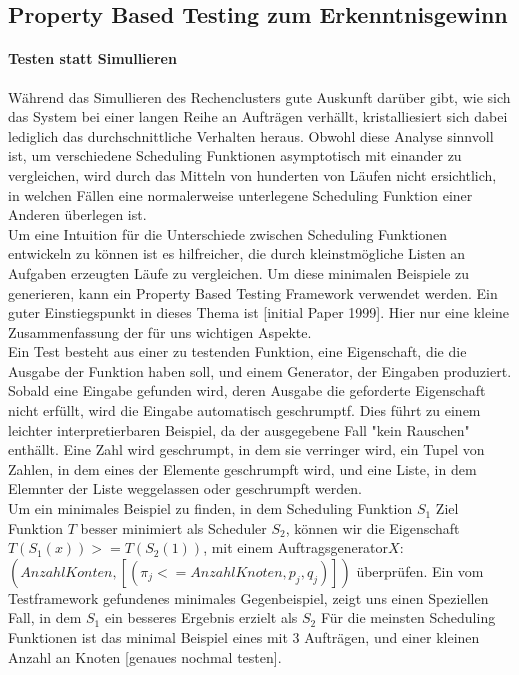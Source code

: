 \FloatBarrier

\subsection{Property Based Testing zum Erkenntnisgewinn}
\label{proptest}
\paragraph{Testen statt Simullieren}
Während das Simullieren des Rechenclusters gute Auskunft darüber gibt, wie sich das System bei einer langen Reihe an Aufträgen verhällt, kristalliesiert sich dabei lediglich das durchschnittliche Verhalten heraus. Obwohl diese Analyse sinnvoll ist, um verschiedene Scheduling Funktionen asymptotisch mit einander zu vergleichen, wird durch das Mitteln von hunderten von Läufen nicht ersichtlich, in welchen Fällen eine normalerweise unterlegene Scheduling Funktion einer Anderen überlegen ist.\\
Um eine Intuition für die Unterschiede zwischen Scheduling Funktionen entwickeln zu können ist es hilfreicher, die durch kleinstmögliche Listen an Aufgaben erzeugten Läufe zu vergleichen. Um diese minimalen Beispiele zu generieren, kann ein Property Based Testing Framework verwendet werden. Ein guter Einstiegspunkt in dieses Thema ist [initial Paper 1999]. Hier nur eine kleine Zusammenfassung der für uns wichtigen Aspekte. \\
Ein Test besteht aus einer zu testenden Funktion, eine Eigenschaft, die die Ausgabe der Funktion haben soll, und einem Generator, der Eingaben produziert. Sobald eine Eingabe gefunden wird, deren Ausgabe die geforderte Eigenschaft nicht erfüllt, wird die Eingabe automatisch geschrumptf. Dies führt zu einem leichter interpretierbaren Beispiel, da der ausgegebene Fall "kein Rauschen" enthällt.
Eine Zahl wird geschrumpt, in dem sie verringer wird, ein Tupel von Zahlen, in dem eines der Elemente geschrumpft wird, und eine Liste, in dem Elemnter der Liste weggelassen oder geschrumpft werden.\\
Um ein minimales Beispiel zu finden, in dem Scheduling Funktion $S_1$ Ziel Funktion $T$ besser minimiert als Scheduler $S_2$, können wir die Eigenschaft $T(S_1(x)) >= T (S_2(1))$, mit einem Auftragsgenerator$X$: $(Anzahl Konten,[(\pi_j <= Anzahl Knoten,p_j,q_j)])$ überprüfen.
Ein vom Testframework gefundenes minimales Gegenbeispiel, zeigt uns einen Speziellen Fall, in dem $S_1$ ein besseres Ergebnis erzielt als $S_2$
Für die meinsten Scheduling Funktionen ist das minimal Beispiel eines mit 3 Aufträgen, und einer kleinen Anzahl an Knoten [genaues nochmal testen].

